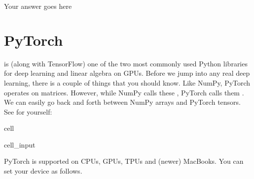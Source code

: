 \documentclass[letterpaper,10pt,english]{jupyterBook}
\begin{document}
\sphinxAtStartPar
Your answer goes here


\section{PyTorch}
\label{\detokenize{notebooks/Tutorial2_ConvolutionalNeuralNetworks/Tutorial2_ConvolutionalNeuralNetworks_student:pytorch}}
\sphinxAtStartPar
{}
 is (along with TensorFlow) one of the two most commonly used Python libraries for deep learning and linear algebra on GPUs. Before we jump into any real deep learning, there is a couple of things that you should know. Like NumPy, PyTorch operates on matrices. However, while NumPy calls these , PyTorch calls them . We can easily go back and forth between NumPy arrays and PyTorch tensors. See for yourself:

\begin{sphinxuseclass}{cell}\begin{sphinxVerbatimInput}

\begin{sphinxuseclass}{cell_input}
\begin{sphinxVerbatim}[commandchars=\\\{\}]
 

  \PYG{p}{[}  \PYG{p}{]}

  

  
\end{sphinxVerbatim}

\end{sphinxuseclass}\end{sphinxVerbatimInput}

\end{sphinxuseclass}
\sphinxAtStartPar
PyTorch is supported on CPUs, GPUs, TPUs and (newer) MacBooks. You can set your device as follows.
\end{document}
